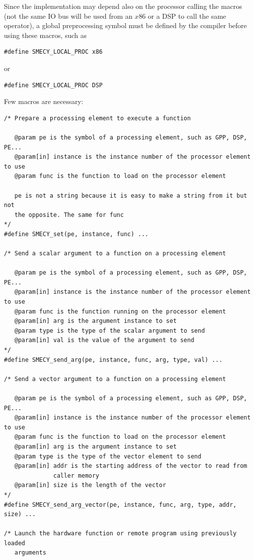 \documentclass[a4paper]{article}
\begin{document}
Since the implementation may depend also on the processor calling the
macros (not the same IO bus will be used from an $x$86 or a DSP to call
the same operator), a global preprocessing symbol must be defined by the
compiler before using these macros, such as
\begin{lstlisting}
#define SMECY_LOCAL_PROC x86
\end{lstlisting}
or
\begin{lstlisting}
#define SMECY_LOCAL_PROC DSP
\end{lstlisting}

Few macros are necessary:
\begin{lstlisting}
/* Prepare a processing element to execute a function

   @param pe is the symbol of a processing element, such as GPP, DSP, PE...
   @param[in] instance is the instance number of the processor element to use
   @param func is the function to load on the processor element

   pe is not a string because it is easy to make a string from it but not
   the opposite. The same for func
*/
#define SMECY_set(pe, instance, func) ...

/* Send a scalar argument to a function on a processing element

   @param pe is the symbol of a processing element, such as GPP, DSP, PE...
   @param[in] instance is the instance number of the processor element to use
   @param func is the function running on the processor element
   @param[in] arg is the argument instance to set
   @param type is the type of the scalar argument to send
   @param[in] val is the value of the argument to send
*/
#define SMECY_send_arg(pe, instance, func, arg, type, val) ...

/* Send a vector argument to a function on a processing element

   @param pe is the symbol of a processing element, such as GPP, DSP, PE...
   @param[in] instance is the instance number of the processor element to use
   @param func is the function to load on the processor element
   @param[in] arg is the argument instance to set
   @param type is the type of the vector element to send
   @param[in] addr is the starting address of the vector to read from
              caller memory
   @param[in] size is the length of the vector
*/
#define SMECY_send_arg_vector(pe, instance, func, arg, type, addr, size) ...

/* Launch the hardware function or remote program using previously loaded
   arguments


\end{lstlisting}
\end{document}
